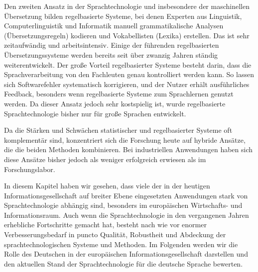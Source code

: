 \documentclass[]{../../metanetpaper}
\begin{document}
\begin{multicols}{2}
Den zweiten Ansatz in der Sprachtechnologie und insbesondere der maschinellen Übersetzung bilden regelbasierte Systeme, bei denen Experten aus Linguistik, Computerlinguistik und Informatik manuell grammatikalische Analysen (Übersetzungsregeln) kodieren und Vokabellisten (Lexika) erstellen. Das ist sehr zeitaufwändig und arbeitsintensiv. Einige der führenden regelbasierten Übersetzungssysteme werden bereits seit über zwanzig Jahren ständig weiterentwickelt. Der große Vorteil regelbasierter Systeme besteht darin, dass die Sprachverarbeitung von den Fachleuten genau kontrolliert werden kann. So lassen sich Softwarefehler systematisch korrigieren, und der Nutzer erhält ausführliches Feedback, besonders wenn regelbasierte Systeme zum  Sprachlernen genutzt werden. Da dieser Ansatz jedoch sehr kostspielig ist, wurde regelbasierte Sprachtechnologie bisher nur für große Sprachen entwickelt. 

Da die Stärken und Schwächen statistischer und regelbasierter Systeme oft komplementär sind, konzentriert sich die Forschung heute auf hybride Ansätze, die die beiden Methoden kombinieren. Bei industriellen Anwendungen haben sich diese Ansätze bisher jedoch als weniger erfolgreich erwiesen als im Forschungslabor. 

In diesem Kapitel haben wir gesehen, dass viele der in der heutigen Informationsgesellschaft auf breiter Ebene eingesetzten Anwendungen stark von Sprachtechnologie abhängig sind, besonders im europäischen Wirtschafts- und Informationsraum. Auch wenn die Sprachtechnologie in den vergangenen Jahren erhebliche Fortschritte gemacht hat, besteht nach wie vor enormer Verbesserungsbedarf in puncto Qualität, Robustheit und Abdeckung der sprachtechnologischen Systeme und Methoden. Im Folgenden werden wir die Rolle des Deutschen in der europäischen Informationsgesellschaft darstellen und den aktuellen Stand der Sprachtechnologie für die deutsche Sprache bewerten.  
\end{multicols}

\clearpage


\end{document}

